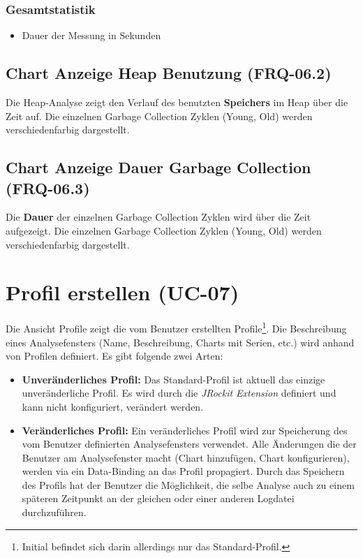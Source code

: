 \subsubsection{Gesamtstatistik}
\begin{itemize}
	\item Dauer der Messung in Sekunden
\end{itemize}

\subsection{Chart Anzeige Heap Benutzung (FRQ-06.2)}
Die Heap-Analyse zeigt den Verlauf des benutzten \textbf{Speichers} im Heap über die Zeit auf. Die einzelnen Garbage Collection Zyklen (Young, Old) werden verschiedenfarbig dargestellt.

\subsection{Chart Anzeige Dauer Garbage Collection (FRQ-06.3)}
Die \textbf{Dauer} der einzelnen Garbage Collection Zyklen wird über die Zeit aufgezeigt. Die einzelnen Garbage Collection Zyklen (Young, Old) werden verschiedenfarbig dargestellt.

\section{Profil erstellen (UC-07)}
Die Ansicht Profile zeigt die vom Benutzer erstellten Profile\footnote{Initial befindet sich darin allerdings nur das Standard-Profil.}. Die Beschreibung eines Analysefensters (Name, Beschreibung, Charts mit Serien, etc.) wird anhand von Profilen definiert. Es gibt folgende zwei Arten:
\begin{itemize}
	\item \textbf{Unveränderliches Profil:} Das Standard-Profil ist aktuell das einzige unveränderliche Profil. Es wird durch die \textit{JRockit Extension} definiert und kann nicht konfiguriert, verändert werden.
	\item \textbf{Veränderliches Profil:} Ein veränderliches Profil wird zur Speicherung des vom Benutzer definierten Analysefensters verwendet. Alle Änderungen die der Benutzer am Analysefenster macht (Chart hinzufügen, Chart konfigurieren), werden via ein Data-Binding an das Profil propagiert. Durch das Speichern des Profils hat der Benutzer die Möglichkeit, die selbe Analyse auch zu einem späteren Zeitpunkt an der gleichen oder einer anderen Logdatei durchzuführen.
\end{itemize}


